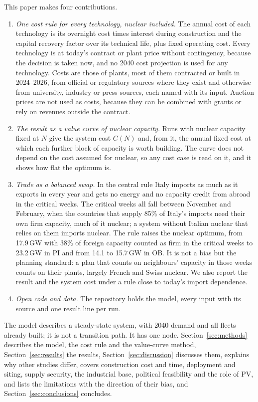 This paper makes four contributions.
\begin{enumerate}\setlength\itemsep{1pt}
\item \emph{One cost rule for every technology, nuclear included.} The annual cost of each technology is its overnight cost times interest during construction and the capital recovery factor over its technical life, plus fixed operating cost. Every technology is at today's contract or plant price without contingency, because the decision is taken now, and no 2040 cost projection is used for any technology. Costs are those of plants, most of them contracted or built in 2024--2026, from official or regulatory sources where they exist and otherwise from university, industry or press sources, each named with its input. Auction prices are not used as costs, because they can be combined with grants or rely on revenues outside the contract.
\item \emph{The result as a value curve of nuclear capacity.} Runs with nuclear capacity fixed at $N$ give the system cost $C(N)$ and, from it, the annual fixed cost at which each further block of capacity is worth building. The curve does not depend on the cost assumed for nuclear, so any cost case is read on it, and it shows how flat the optimum is.
\item \emph{Trade as a balanced swap.} In the central rule Italy imports as much as it exports in every year and gets no energy and no capacity credit from abroad in the critical weeks. The critical weeks all fall between November and February, when the countries that supply 85\% of Italy's imports need their own firm capacity, much of it nuclear; a system without Italian nuclear that relies on them imports nuclear. The rule raises the nuclear optimum, from 17.9\,GW with 38\% of foreign capacity counted as firm in the critical weeks to 23.2\,GW in PI and from 14.1 to 15.7\,GW in OB. It is not a bias but the planning standard: a plan that counts on neighbours' capacity in those weeks counts on their plants, largely French and Swiss nuclear. We also report the result and the system cost under a rule close to today's import dependence.
\item \emph{Open code and data.} The repository holds the model, every input with its source and one result line per run.
\end{enumerate}

The model describes a steady-state system, with 2040 demand and all fleets already built; it is not a transition path. It has one node. Section~\ref{sec:methods} describes the model, the cost rule and the value-curve method, Section~\ref{sec:results} the results, Section~\ref{sec:discussion} discusses them, explains why other studies differ, covers construction cost and time, deployment and siting, supply security, the industrial base, political feasibility and the role of PV, and lists the limitations with the direction of their bias, and Section~\ref{sec:conclusions} concludes.
